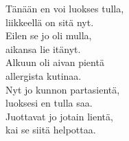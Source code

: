 
            Tänään en voi luokses tulla, \\
            liikkeellä on sitä nyt. \\
            Eilen se jo oli mulla, \\
            aikansa lie itänyt. \\
            Alkuun oli aivan pientä \\
            allergista kutinaa. \\
            Nyt jo kunnon partasientä, \\
            luoksesi en tulla saa. \\
            Juottavat jo jotain lientä, \\
            kai se siitä helpottaa. \\
